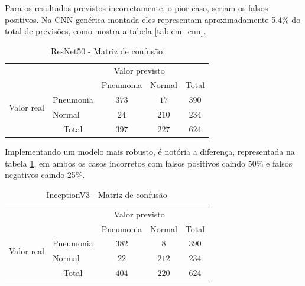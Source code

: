 Para os resultados previstos incorretamente, o pior caso, seriam os falsos positivos. Na CNN genérica montada eles representam aproximadamente 5.4\% do total de previsões, como mostra a tabela \ref{tab:cm_cnn}.

\newpage

\begin{table}[!ht]
    \centering
    \begin{tabular}{l|l|c|c|c}
        \multicolumn{2}{c}{}&\multicolumn{2}{c}{Valor previsto}&\\
        \cline{3-4}
        \multicolumn{2}{c|}{}&Pneumonia&Normal&\multicolumn{1}{c}{Total}\\
        \cline{2-4}
        \multirow{2}{*}{Valor real}& Pneumonia & $373$ & $17$ & $390$\\
        \cline{2-4}
        & Normal & $24$ & $210$ & $234$\\
        \cline{2-4}
        \multicolumn{1}{c}{} & \multicolumn{1}{c}{Total} & \multicolumn{1}{c}{$397$} & \multicolumn{    1}{c}{$227$} & \multicolumn{1}{c}{$624$}\\
    \end{tabular}
    \caption{ResNet50 - Matriz de confusão}
    \label{tab:res_cm}
\end{table}

Implementando um modelo mais robusto, é notória a diferença, representada na tabela \ref{tab:res_cm}, em ambos os casos incorretos com falsos positivos caindo 50\% e falsos negativos caindo 25\%.

\begin{table}[!ht]
    \centering
    \begin{tabular}{l|l|c|c|c}
        \multicolumn{2}{c}{}&\multicolumn{2}{c}{Valor previsto}&\\
        \cline{3-4}
        \multicolumn{2}{c|}{}&Pneumonia&Normal&\multicolumn{1}{c}{Total}\\
        \cline{2-4}
        \multirow{2}{*}{Valor real}& Pneumonia & $382$ & $8$ & $390$\\
        \cline{2-4}
        & Normal & $22$ & $212$ & $234$\\
        \cline{2-4}
        \multicolumn{1}{c}{} & \multicolumn{1}{c}{Total} & \multicolumn{1}{c}{$404$} & \multicolumn{    1}{c}{$220$} & \multicolumn{1}{c}{$624$}\\
    \end{tabular}
    \caption{InceptionV3 - Matriz de confusão}
    \label{tab:cm_incep}
\end{table}

